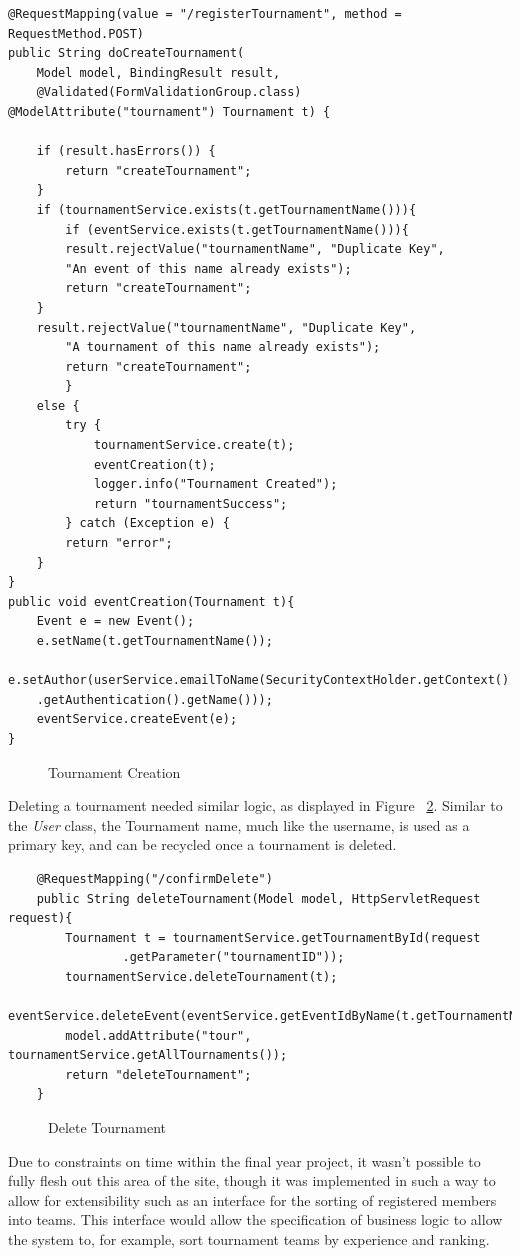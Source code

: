 \begin{lstlisting}
@RequestMapping(value = "/registerTournament", method = RequestMethod.POST)
public String doCreateTournament(
	Model model, BindingResult result,
	@Validated(FormValidationGroup.class) @ModelAttribute("tournament") Tournament t) {
	
	if (result.hasErrors()) {
		return "createTournament";
	} 
	if (tournamentService.exists(t.getTournamentName())){
		if (eventService.exists(t.getTournamentName())){
		result.rejectValue("tournamentName", "Duplicate Key",
		"An event of this name already exists");
		return "createTournament";
	}
	result.rejectValue("tournamentName", "Duplicate Key",
		"A tournament of this name already exists");
		return "createTournament";
		}
	else {
		try {
			tournamentService.create(t);
			eventCreation(t);
			logger.info("Tournament Created");
			return "tournamentSuccess";
		} catch (Exception e) {
		return "error";
	}
}
public void eventCreation(Tournament t){
	Event e = new Event();
	e.setName(t.getTournamentName());
	e.setAuthor(userService.emailToName(SecurityContextHolder.getContext()
	.getAuthentication().getName()));
	eventService.createEvent(e);
}
\end{lstlisting}
\begin{figure}[H]
\caption{Tournament Creation}
\label{fig:tourCreate}
\end{figure}

Deleting a tournament needed similar logic, as displayed in Figure ~\ref{fig:deleteTour}. Similar to the \textit{User} class, the Tournament name, much like the username, is used as a primary key, and can be recycled once a tournament is deleted. 

\begin{lstlisting}
	@RequestMapping("/confirmDelete")
	public String deleteTournament(Model model, HttpServletRequest request){
		Tournament t = tournamentService.getTournamentById(request
				.getParameter("tournamentID"));
		tournamentService.deleteTournament(t);
		eventService.deleteEvent(eventService.getEventIdByName(t.getTournamentName()));
		model.addAttribute("tour", tournamentService.getAllTournaments());
		return "deleteTournament";
	}
\end{lstlisting}
\begin{figure}[H]
\caption{Delete Tournament}
\label{fig:deleteTour}
\end{figure}	

Due to constraints on time within the final year project, it wasn't possible to fully flesh out this area of the site, though it was implemented in such a way to allow for extensibility such as an interface for the sorting of registered members into teams. This interface would allow the specification of business logic to allow the system to, for example, sort tournament teams by experience and ranking.
	
